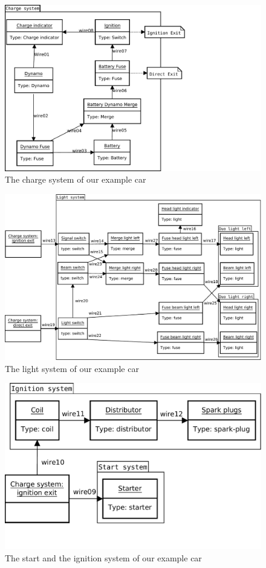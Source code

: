\begin{figure}[htbp]
	\centering
		\includegraphics[width=1.00\textwidth]{ChargeSystem.pdf}
	\caption{The charge system of our example car}
	\label{fig:ChargeSystem}
\end{figure}

\begin{figure}[htbp]
	\centering
		\includegraphics[width=1.00\textwidth]{LightSystem.pdf}
	\caption{The light system of our example car}
	\label{fig:LightSystem}
\end{figure}

\begin{figure}[htbp]
	\centering
		\includegraphics[width=1.00\textwidth]{StartAndIgnitionSystem.pdf}
	\caption{The start and the ignition system of our example car}
	\label{fig:StartAndIgnitionSystem}
\end{figure}


